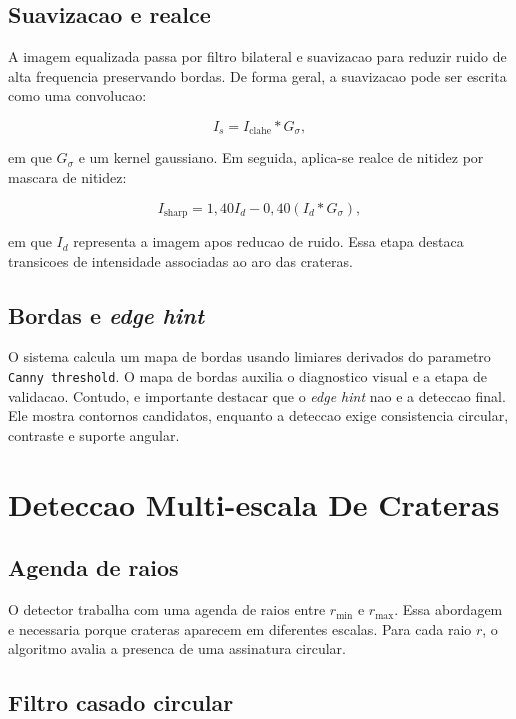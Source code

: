 \documentclass[12pt,a4paper]{article}
\begin{document}
\subsection{Suavizacao e realce}

A imagem equalizada passa por filtro bilateral e suavizacao para reduzir ruido de alta frequencia preservando bordas. De forma geral, a suavizacao pode ser escrita como uma convolucao:

\begin{equation}
I_s = I_{\text{clahe}} * G_{\sigma},
\end{equation}

em que $G_{\sigma}$ e um kernel gaussiano. Em seguida, aplica-se realce de nitidez por mascara de nitidez:

\begin{equation}
I_{\text{sharp}} = 1{,}40I_d - 0{,}40(I_d * G_{\sigma}),
\end{equation}

em que $I_d$ representa a imagem apos reducao de ruido. Essa etapa destaca transicoes de intensidade associadas ao aro das crateras.

\subsection{Bordas e \textit{edge hint}}

O sistema calcula um mapa de bordas usando limiares derivados do parametro \texttt{Canny threshold}. O mapa de bordas auxilia o diagnostico visual e a etapa de validacao. Contudo, e importante destacar que o \textit{edge hint} nao e a deteccao final. Ele mostra contornos candidatos, enquanto a deteccao exige consistencia circular, contraste e suporte angular.

\section{Deteccao Multi-escala De Crateras}

\subsection{Agenda de raios}

O detector trabalha com uma agenda de raios entre $r_{\min}$ e $r_{\max}$. Essa abordagem e necessaria porque crateras aparecem em diferentes escalas. Para cada raio $r$, o algoritmo avalia a presenca de uma assinatura circular.

\subsection{Filtro casado circular}
\end{document}
